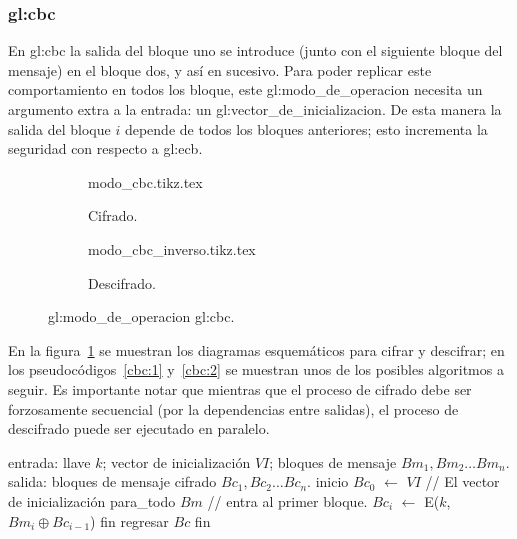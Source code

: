 %
%

\subsubsection{\texorpdfstring{\acrfull{gl:cbc}}{Cipher-block Chaining (CBC)}}
\label{sec:cbc}

\nopagebreak[4]
En \gls{gl:cbc} la salida del bloque uno se introduce (junto con
el siguiente bloque del mensaje) en el bloque dos, y así en sucesivo.
Para poder replicar este comportamiento en todos los bloque, este
\gls{gl:modo_de_operacion} necesita un argumento extra a la entrada: un
\gls{gl:vector_de_inicializacion}. De esta manera la salida del bloque $ i $
depende de todos los bloques anteriores; esto incrementa la seguridad con
respecto a \gls{gl:ecb}.

\begin{figure}
  \centering
  \begin{subfigure}{0.45\textwidth}
    \begin{center}
      {modo_cbc.tikz.tex}
      \caption{Cifrado.}
    \end{center}
  \end{subfigure}
  \begin{subfigure}{0.45\textwidth}
    \begin{center}
      {modo_cbc_inverso.tikz.tex}
      \caption{Descifrado.}
    \end{center}
  \end{subfigure}
  \caption{\Gls{gl:modo_de_operacion} \acrshort{gl:cbc}.}
  \label{figura:cbc}
\end{figure}

En la figura~\ref{figura:cbc} se muestran los diagramas esquemáticos para
cifrar y descifrar; en los pseudocódigos~\ref{cbc:1} y~\ref{cbc:2} se muestran
unos de los posibles algoritmos a seguir. Es importante notar que mientras que
el proceso de cifrado debe ser forzosamente secuencial (por la dependencias
entre salidas), el proceso de descifrado puede ser ejecutado en paralelo.


\begin{pseudocodigo}[%
    caption={\Gls{gl:modo_de_operacion} \acrshort{gl:cbc}, cifrado.},
    label={cbc:1}%
  ]
    entrada: llave $ k $; vector de inicialización $ VI $;
             bloques de mensaje $ Bm_1, Bm_2 \dots Bm_n $.
    salida:  bloques de mensaje cifrado $ Bc_1, Bc_2 \dots Bc_n $.
    inicio
      $Bc_0$ $\gets$ $ VI $                        // El vector de inicialización
      para_todo $Bm$               // entra al primer bloque.
        $Bc_i$ $\gets$ E($k$, $Bm_i \oplus Bc_{i - 1}$)
      fin
      regresar $Bc$
    fin
\end{pseudocodigo}

